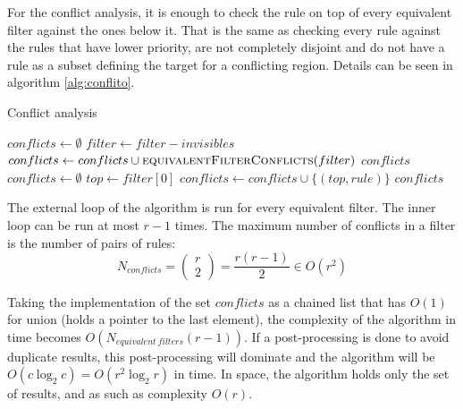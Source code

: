 
For the conflict analysis, it is enough to check the rule on top of every
equivalent filter against the ones below it. That is the same as checking every
rule against the rules that have lower priority, are not completely disjoint and
do not have a rule as a subset defining the target for a conflicting region.
Details can be seen in algorithm \ref{alg:conflito}.

\begin{algorithm}
	\caption{\label{alg:conflito}Conflict analysis}
	\begin{algorithmic}[1]
			\State $conflicts \gets \emptyset$
				\State $filter \gets filter - invisibles$
				\State $conflicts \gets conflicts \cup \Calll{equivalentFilterConflicts}{filter}$
			\EndFor
			\State \Return $conflicts$
		\EndFunction
		\State
			\State $conflicts \gets \emptyset$
			\State $top \gets filter[0]$
					\State $conflicts \gets conflicts \cup \{(top, rule)\}$
				\EndIf
			\EndFor
			\State \Return $conflicts$
		\EndFunction
	\end{algorithmic}
\end{algorithm}

The external loop of the algorithm is run for every equivalent filter. The inner
loop can be run at most $r-1$ times. The maximum number of conflicts in a filter
is the number of pairs of rules:
\begin{equation}
	N_{conflicts} = \left( \begin{array}{ll} r \\ 2 \end{array} \right) = \frac{r(r-1)}{2} \in O(r^2)
\end{equation}

Taking the implementation of the set $conflicts$ as a chained list that has
$O(1)$ for union (holds a pointer to the last element), the complexity of the
algorithm in time becomes $O(N_{equivalent\ filters} (r-1))$. If a post-processing
is done to avoid duplicate results, this post-processing will dominate and the
algorithm will be $O(c\log_{2}c) = O(r^2\log_{2}r)$ in time. In space, the
algorithm holds only the set of results, and as such as complexity $O(r)$.



